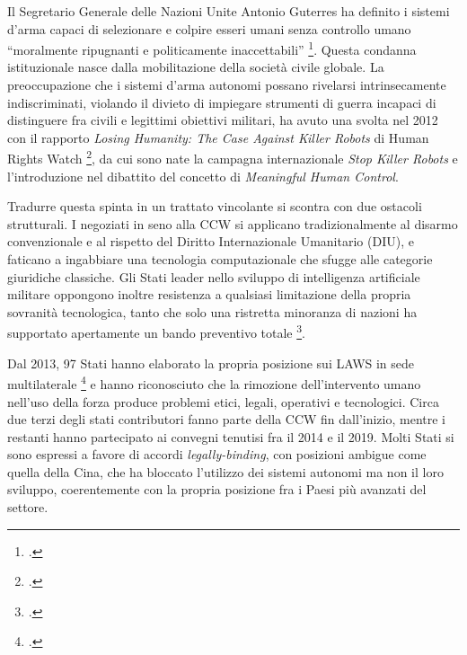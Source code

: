 \documentclass[a4paper,12pt]{report}
\begin{document}
Il Segretario Generale delle Nazioni Unite Antonio Guterres ha definito i
sistemi d'arma capaci di selezionare e colpire esseri umani senza controllo
umano ``moralmente ripugnanti e politicamente inaccettabili''
\footcite{un_2018_guterres_sgsm}. Questa condanna istituzionale nasce dalla
mobilitazione della società civile
globale. La preoccupazione che i sistemi d'arma autonomi possano rivelarsi
intrinsecamente indiscriminati, violando il divieto di impiegare strumenti di
guerra incapaci di distinguere fra civili e legittimi obiettivi militari, ha
avuto una svolta nel 2012 con il rapporto \textit{Losing Humanity: The Case
Against Killer Robots} di Human Rights Watch \footcite[p.~4]{wareham_2020}, da cui
sono nate la campagna internazionale \textit{Stop Killer Robots} e
l'introduzione nel dibattito del concetto di \textit{Meaningful Human Control}.
 
Tradurre questa spinta in un trattato vincolante si scontra con due ostacoli
strutturali. I negoziati in seno alla CCW si applicano tradizionalmente al
disarmo convenzionale e al rispetto del Diritto Internazionale Umanitario (DIU),
e faticano a ingabbiare una tecnologia computazionale che sfugge alle categorie
giuridiche classiche. Gli Stati leader nello sviluppo di intelligenza
artificiale militare oppongono inoltre resistenza a qualsiasi limitazione della
propria sovranità tecnologica, tanto che solo una ristretta minoranza di nazioni
ha supportato apertamente un bando preventivo totale \footcite[p.~4]{wareham_2020}.
 
Dal 2013, 97 Stati hanno elaborato la propria posizione sui LAWS in sede
multilaterale \footcite[p.~29]{wareham_2020} e hanno riconosciuto che la rimozione
dell'intervento umano nell'uso della forza produce problemi etici, legali,
operativi e tecnologici. Circa due terzi degli stati contributori fanno parte della CCW
fin dall'inizio, mentre i restanti hanno partecipato ai convegni tenutisi fra il
2014 e il 2019. Molti Stati si sono espressi a favore di accordi
\textit{legally-binding}, con posizioni ambigue come quella della Cina, che ha
bloccato l'utilizzo dei sistemi autonomi ma non il loro sviluppo, coerentemente
con la propria posizione fra i Paesi più avanzati del settore.
 
\end{document}

